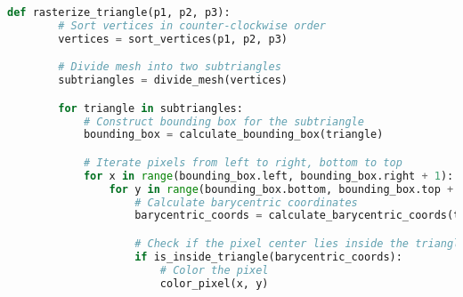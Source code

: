 \documentclass{article}
\begin{document}
\begin{lstlisting}[language=Python]
    def rasterize_triangle(p1, p2, p3):
        # Sort vertices in counter-clockwise order
        vertices = sort_vertices(p1, p2, p3)

        # Divide mesh into two subtriangles
        subtriangles = divide_mesh(vertices)

        for triangle in subtriangles:
            # Construct bounding box for the subtriangle
            bounding_box = calculate_bounding_box(triangle)

            # Iterate pixels from left to right, bottom to top
            for x in range(bounding_box.left, bounding_box.right + 1):
                for y in range(bounding_box.bottom, bounding_box.top + 1):
                    # Calculate barycentric coordinates
                    barycentric_coords = calculate_barycentric_coords(triangle, x, y)

                    # Check if the pixel center lies inside the triangle
                    if is_inside_triangle(barycentric_coords):
                        # Color the pixel
                        color_pixel(x, y)
\end{lstlisting}
\end{document}
